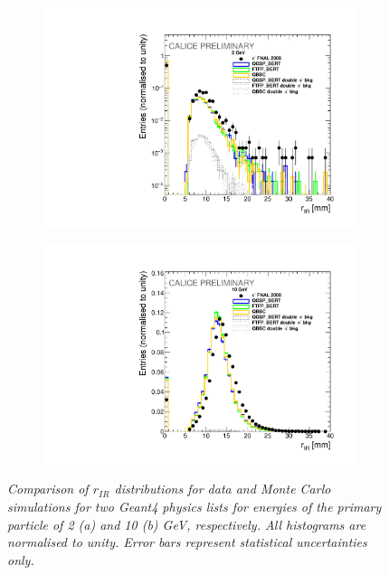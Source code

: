 \begin{figure}
	\centering
	\begin{subfigure}{0.5\textwidth}
		\centering
		\includegraphics[width=.90\linewidth]{ECAL/plots/r-ir-2.pdf}
		\caption{\label{fig:rir2} }
	\end{subfigure}%
	\begin{subfigure}{0.5\textwidth}
		\centering
		\includegraphics[width=.90\linewidth]{ECAL/plots/r-ir-10.pdf}
		\caption{\label{fig:rir10} }
	\end{subfigure}
	\caption{\label{fig:rirexample} \sl %
		 Comparison of $r_{IR}$ distributions for data and Monte Carlo simulations for two {\sc Geant}4 physics lists for energies of the primary particle of 2 (a) and 10 (b) GeV, respectively. All histograms are normalised to unity. Error bars represent statistical uncertainties only.}
\end{figure}

